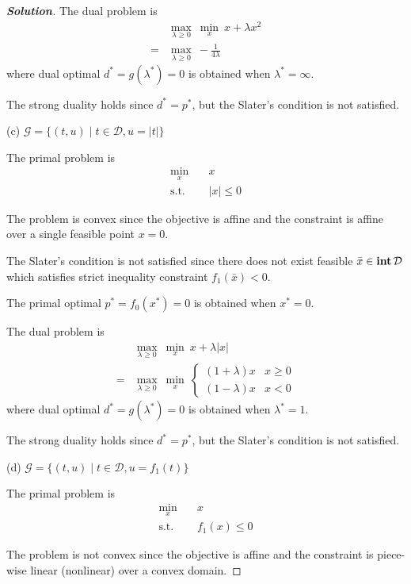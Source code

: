 \documentclass[11pt]{article}
\newenvironment{solution}
  {\renewcommand\qedsymbol{$\square$}\begin{proof}[\textbf{Solution}]}
  {\end{proof}}
\begin{document}
\begin{solution}
The dual problem is
\begin{align*}
  &\max_{\lambda\geq 0}\ \min_x \ x + \lambda x^2\\
  =& \max_{\lambda\geq 0}\ - \frac{1}{4\lambda}
\end{align*}
where dual optimal $d^* = g(\lambda^*) = 0$ is obtained when $\lambda^* = \infty$.

The strong duality holds since $d^* = p^*$, but the Slater's condition is not satisfied.

(c) $\mathcal{G} = \{(t, u) \mid t\in\mathcal{D}, u = |t|\}$

The primal problem is
\begin{align*}
  \min_x \quad & x\\
  \text{s.t.} \quad & |x| \leq 0
\end{align*}

The problem is convex since the objective is affine and the constraint is affine over a single feasible point $x=0$.

The Slater's condition is not satisfied since there does not exist feasible $\bar x\in \mathop{\textbf{int}} \mathcal{D}$ which satisfies strict inequality constraint $f_1(\bar x) < 0 $.

The primal optimal $p^* = f_0(x^*) = 0$ is obtained when $x^* = 0$.

The dual problem is
\begin{align*}
  &\max_{\lambda\geq 0}\ \min_x \ x + \lambda |x|\\
  =& \max_{\lambda\geq 0}\ \min_x \ 
  \begin{cases}
    (1 + \lambda) x & x \geq 0\\
    (1 - \lambda) x & x < 0
  \end{cases}
\end{align*}
where dual optimal $d^* = g(\lambda^*) = 0$ is obtained when $\lambda^* = 1$.

The strong duality holds since $d^* = p^*$, but the Slater's condition is not satisfied.

(d) $\mathcal{G} = \{(t, u) \mid t\in\mathcal{D}, u = f_1(t)\}$

The primal problem is
\begin{align*}
  \min_x \quad & x\\
  \text{s.t.} \quad & f_1(x) \leq 0
\end{align*}

The problem is not convex since the objective is affine and the constraint is piece-wise linear (nonlinear) over a convex domain.


\end{solution}
\end{document}
